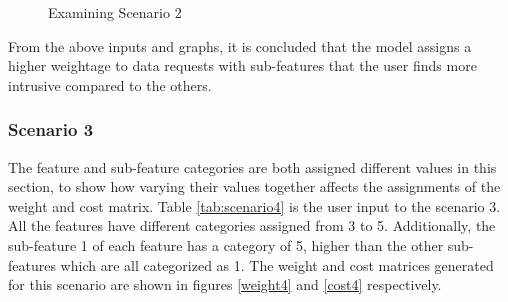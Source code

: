 \begin{figure}[htp]
  \hspace{1em}
  \caption{Examining Scenario 2}
  \label{fig:scenatio3}
\end{figure}


%


From the above inputs and graphs, it is concluded that the model assigns a higher weightage to data requests with sub-features that the user finds more intrusive compared to the others.

\subsubsection{Scenario 3}
The feature and sub-feature categories are both assigned different values in this section, to show how varying their values together affects the assignments of the weight and cost matrix. Table \ref{tab:scenario4} is the user input to the scenario 3. All the features have different categories assigned from 3 to 5. Additionally, the sub-feature 1 of each feature has a category of 5, higher than the other sub-features which are all categorized as 1. The weight and cost matrices generated for this scenario are shown in figures \ref{weight4} and \ref{cost4} respectively. 

